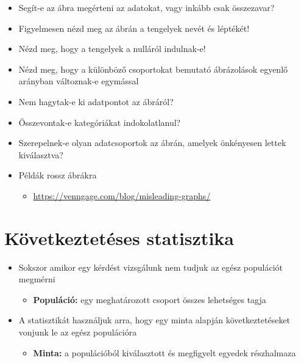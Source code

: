 \documentclass[
  letterpaper,
  DIV=11,
  numbers=noendperiod]{scrreprt}
\providecommand{\tightlist}{%
  \setlength{\itemsep}{0pt}\setlength{\parskip}{0pt}}\usepackage{longtable,booktabs,array}
\begin{document}
\begin{itemize}
\item
  Segít-e az ábra megérteni az adatokat, vagy inkább csak összezavar?
\item
  Figyelmesen nézd meg az ábrán a tengelyek nevét és léptékét!
\item
  Nézd meg, hogy a tengelyek a nulláról indulnak-e!~
\item
  Nézd meg, hogy a különböző csoportokat bemutató ábrázolások egyenlő
  arányban változnak-e egymással
\item
  Nem hagytak-e ki adatpontot az ábráról?
\item
  Összevontak-e kategóriákat indokolatlanul?
\item
  Szerepelnek-e olyan adatcsoportok az ábrán, amelyek önkényesen lettek
  kiválasztva?
\item
  Példák rossz ábrákra

  \begin{itemize}
  \tightlist
  \item
    \url{https://venngage.com/blog/misleading-graphs/}
  \end{itemize}
\end{itemize}


\hypertarget{kuxf6vetkeztetuxe9ses-statisztika}{%
\chapter{Következtetéses
statisztika}\label{kuxf6vetkeztetuxe9ses-statisztika}}

\begin{itemize}
\item
  Sokszor amikor egy kérdést vizsgálunk nem tudjuk az egész populációt
  megmérni

  \begin{itemize}
  \tightlist
  \item
    \textbf{Populáció:} egy meghatározott csoport összes lehetséges
    tagja
  \end{itemize}
\item
  A statisztikát használjuk arra, hogy egy minta alapján
  következtetéseket vonjunk le az egész populációra

  \begin{itemize}
  \tightlist
  \item
    \textbf{Minta:} a populációból kiválasztott és megfigyelt egyedek
    részhalmaza
  \end{itemize}
\end{itemize}
\end{document}
